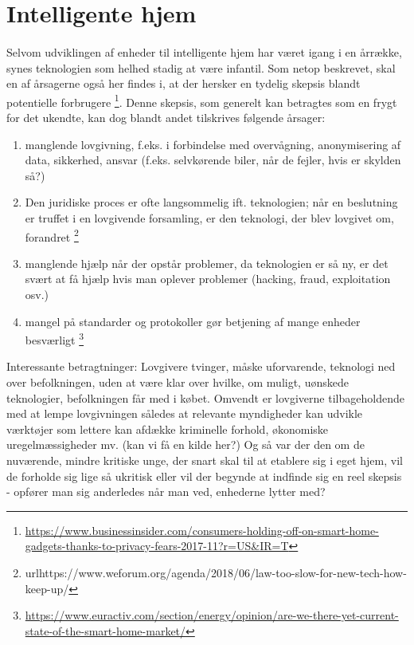 \documentclass{article}
\begin{document}
\section{Intelligente hjem}
\paragraph{}
Selvom udviklingen af enheder til intelligente hjem har været igang i en årrække, synes teknologien som helhed stadig at være infantil.
Som netop beskrevet, skal en af årsagerne også her findes i, at der hersker en tydelig skepsis blandt potentielle forbrugere \footnote{\url{https://www.businessinsider.com/consumers-holding-off-on-smart-home-gadgets-thanks-to-privacy-fears-2017-11?r=US\&IR=T}}.
Denne skepsis, som generelt kan betragtes som en frygt for det ukendte, kan dog blandt andet tilskrives følgende årsager:
\begin{enumerate}
    \item manglende lovgivning, f.eks. i forbindelse med overvågning, anonymisering af data, sikkerhed, ansvar (f.eks. selvkørende biler, når de fejler, hvis er skylden så?)
    \item Den juridiske proces er ofte langsommelig ift. teknologien; når en beslutning er truffet i en lovgivende forsamling, er den teknologi, der blev lovgivet om, forandret \footnote{url{https://www.weforum.org/agenda/2018/06/law-too-slow-for-new-tech-how-keep-up/}}
    \item manglende hjælp når der opstår problemer, da teknologien er så ny, er det svært at få hjælp hvis man oplever problemer (hacking, fraud, exploitation osv.)
    \item mangel på standarder og protokoller gør betjening af mange enheder besværligt \footnote{\url{https://www.euractiv.com/section/energy/opinion/are-we-there-yet-current-state-of-the-smart-home-market/}}
\end{enumerate} 
Interessante betragtninger: Lovgivere tvinger, måske uforvarende, teknologi ned over befolkningen, uden at være klar over hvilke, om muligt, uønskede teknologier, befolkningen får med i købet.
Omvendt er lovgiverne tilbageholdende med at lempe lovgivningen således at relevante myndigheder kan udvikle værktøjer som lettere kan afdække kriminelle forhold, økonomiske uregelmæssigheder mv. (kan vi få en kilde her?)
Og så var der den om de nuværende, mindre kritiske unge, der snart skal til at etablere sig i eget hjem, vil de forholde sig lige så ukritisk eller vil der begynde at indfinde sig en reel skepsis - opfører man sig anderledes når man ved, enhederne lytter med?
\end{document}
